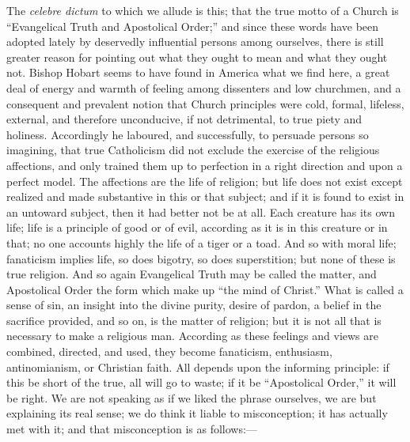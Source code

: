 The \emph{celebre dictum} to which we allude is
this; that the true motto of a Church is ``Evangelical Truth and
Apostolical Order;'' and since these words have been adopted lately by
deservedly influential persons among ourselves, there is still greater
reason for pointing out what they ought to mean and what they
ought not. Bishop Hobart seems to have found in America what we find
here, a great deal of energy and warmth of feeling among dissenters
and low churchmen, and a consequent and prevalent notion that Church
principles were cold, formal, lifeless, external, and therefore
unconducive, if not detrimental, to true piety and holiness.
Accordingly he laboured, and successfully, to persuade persons so
imagining, that true Catholicism did not exclude the exercise of the
religious affections, and only trained them up to perfection in a
right direction and upon a perfect model. The affections are the life
of religion; but life does not exist except realized and made
substantive in this or that subject; and if it is found to exist in an
untoward subject, then it had better not be at all. Each creature has
its own life; life is a principle of good or of evil, according as it
is in this creature or in that; no one accounts highly the life of a
tiger or a toad. And so with moral life; fanaticism implies life, so
does bigotry, so does superstition; but none of these is true
religion. And so again Evangelical Truth may be called the matter, and
Apostolical Order the form which make up ``the mind of Christ.'' What is
called a sense of sin, an insight into the divine purity, desire of
pardon, a belief in the sacrifice provided, and so on, is the matter
of religion; but it is not all that is necessary to make a religious
man. According as these feelings and views are combined, directed, and
used, they become fanaticism, enthusiasm, antinomianism, or Christian
faith. All depends upon the informing principle: if this be short of
the true, all will go to waste; if it be ``Apostolical Order,'' it will
be right. We are not speaking as if we liked the phrase ourselves, we
are but explaining its real sense; we do think it liable to
misconception; it has actually met with it; and that
misconception is as follows:—

